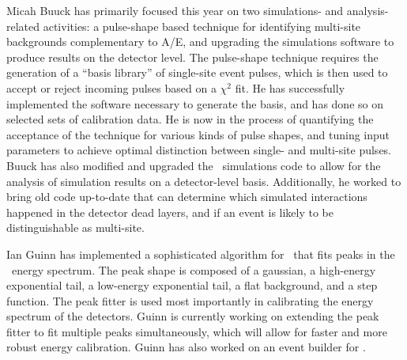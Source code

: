 Micah Buuck has primarily focused this year on two simulations- and analysis-related activities: a pulse-shape based technique for identifying multi-site backgrounds complementary to A/E, and upgrading the simulations software to produce results on the detector level.\newline
\indent The pulse-shape technique requires the generation of a ``basis library'' of single-site event pulses, which is then used to accept or reject incoming pulses based on a $\chi^2$ fit. He has successfully implemented the software necessary to generate the basis, and has done so on selected sets of calibration data. He is now in the process of quantifying the acceptance of the technique for various kinds of pulse shapes, and tuning input parameters to achieve optimal distinction between single- and multi-site pulses.\newline
\indent Buuck has also modified and upgraded the \MJ\ simulations code to allow for the analysis of simulation results on a detector-level basis. Additionally, he worked to bring old code up-to-date that can determine which simulated interactions happened in the detector dead layers, and if an event is likely to be distinguishable as multi-site.

Ian Guinn has implemented a sophisticated algorithm for \MJ\ that fits peaks in the \MJDemo\ energy spectrum. The peak shape is composed of a gaussian, a high-energy exponential tail, a low-energy exponential tail, a flat background, and a step function. The peak fitter is used most importantly in calibrating the energy spectrum of the detectors. Guinn is currently working on extending the peak fitter to fit multiple peaks simultaneously, which will allow for faster and more robust energy calibration.\newline
\indent Guinn has also worked on an event builder for \MJ.

